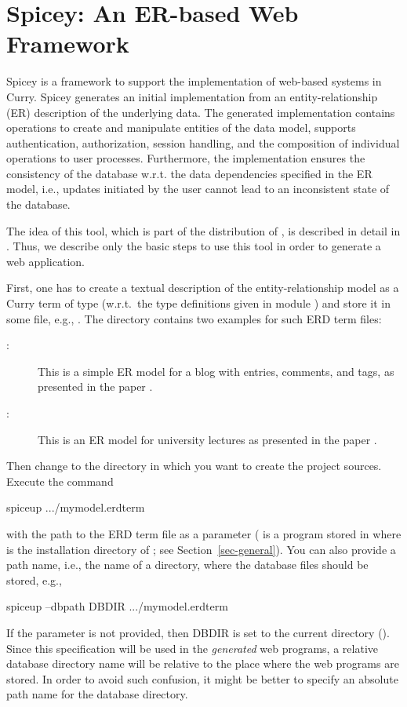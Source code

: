 \section{Spicey: An ER-based Web Framework}
\label{sec-spicey}

Spicey is a framework to support the implementation of
web-based systems in Curry. Spicey generates an initial implementation
from an entity-relationship (ER) description of the underlying
data. The generated implementation contains operations to create and
manipulate entities of the data model, supports authentication,
authorization, session handling, and the composition of individual
operations to user processes. Furthermore, the implementation ensures
the consistency of the database w.r.t. the data dependencies specified
in the ER model, i.e., updates initiated by the user cannot lead to an
inconsistent state of the database.

The idea of this tool, which is part of the distribution of \CYS,
is described in detail in \cite{HanusKoschnicke10PADL}.
Thus, we describe only the basic steps to use this tool
in order to generate a web application.

First, one has to create a textual description of the
entity-relationship model
as a Curry term of type 
(w.r.t.\ the type definitions given in module
)
and store it in some file, e.g., .
The directory 
contains two examples for such ERD term files:
\begin{description}
\item[:]
This is a simple ER model for a blog with entries, comments,
and tags, as presented in the paper \cite{HanusKoschnicke10PADL}.
\item[:]
This is an ER model for university lectures as
presented in the paper \cite{BrasselHanusMueller08PADL}.
\end{description}
%
Then change to the directory in which you want to create
the project sources.
Execute the command
\begin{curry}
spiceup .../mymodel.erdterm
\end{curry}
with the path to the ERD term file as a parameter
( is a program stored in 
where \cyshome is the installation directory of \CYS;
see Section~\ref{sec-general}).
You can also provide a path name, i.e., the name of a directory,
where the database files should be stored, e.g.,
\begin{curry}
spiceup --dbpath DBDIR .../mymodel.erdterm
\end{curry}
If the parameter  is not provided,
then DBDIR is set to the current directory ().
Since this specification will be used in the \emph{generated} web programs,
a relative database directory name will be relative to the place where
the web programs are stored.
In order to avoid such confusion, it might be better to specify
an absolute path name for the database directory.

